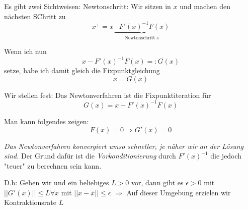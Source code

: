 \documentclass[10pt,a4paper]{article}
\begin{document}

\begin{bsp}[Wiederholung Zusammenhang zwischen Newtonverfahren $F(x)=0$ und Fixpunktiteration]

Es gibt zwei Sichtweisen:
Newtonschritt: Wir sitzen in $x$ und machen den nächsten SChritt zu $$x^{+} = x \underbrace{- F'(x)^{-1}F(x)}_{\text{Newtonschritt s}}$$

Wenn ich nun $$x - F'(x)^{-1}F(x) =: G(x)$$ setze, habe ich damit gleich die Fixpunktgleichung $$x=G(x)$$

Wir stellen fest: Das Newtonverfahren ist die Fixpunktiteration für $$G(x)=x-F'(x)^{-1}F(x)$$

Man kann folgendes zeigen: $$F(\overline{x})=0 \Rightarrow G'(\overline{x})=0$$

\emph{Das Newtonverfahren konvergiert umso schneller, je näher wir an der Lösung sind.} Der Grund dafür ist die \emph{Vorkonditionierung} durch $F'(x)^{-1}$ die jedoch "teuer" zu berechnen sein kann.

D.h: Geben wir und ein beliebiges $L>0$ vor, dann gibt es $\epsilon > 0$ mit $||G'(x)|| \leq L \forall x$ mit $||x-\overline{x}|| \leq \epsilon$ $\Rightarrow$ Auf dieser Umgebung erzielen wir Kontraktionsrate $L$
\end{bsp}
\end{document}
